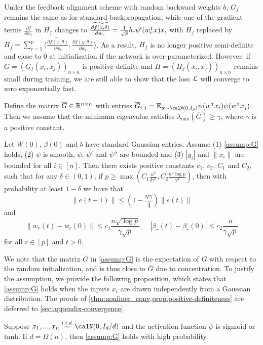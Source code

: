 Under the feedback alignment scheme with random backward weights $b$, $G_f$ remains the same as for standard backpropagation, while one of the gradient terms $\frac{\partial f}{\partial w_r}$ in $H_f$ changes to
$\widetilde{\frac{\partial f(x, \theta)}{\partial w_r}}   = \frac{1}{\sqrt{p}} b_r \psi'(w_r\transpose x)x,
$
with $H_f$ replaced by $H_f = \sum_{r=1}^p\Big\langle \widetilde{\frac{\partial f (x,\theta)}{\partial w_r}},\frac{\partial f (y,\theta)}{\partial w_r}\Big\rangle$.
As a result, $H_f$ is no longer positive semi-definite and close to $0$ at initialization if the network is over-parameterized. However, if $G = (G_f(x_i,x_j))_{n\times n}$ is positive definite and $H = (H_f(x_i,x_j))_{n\times n}$ remains small during training, we are still able to show that the loss $\mathcal{L}$ will converge to zero exponentially fast.

\begin{assumption}\label{assump:G}
Define the matrix $\overline{G} \in \mathbb{R}^{n\times n}$ with entries
$\overline{G}_{i,j} = \E_{w\sim \calN(0,I_p)}\psi(w\transpose x_i) \psi(w\transpose  x_j)$.
Then we assume that the minimum eigenvalue satisfies $\lambda_{\min}(\overline{G}) \geq \gamma$, where $\gamma$ is a positive constant.
\end{assumption}
\vskip5pt

\begin{theorem}\label{thm:nonliner_conv}
Let $W(0)$, $\beta(0)$ and $b$ have \iid standard Gaussian entries. Assume \textnormal{(1)} \cref{assump:G} holds, \textnormal{(2)} $\psi$ is smooth, $\psi$, $\psi'$ and $\psi''$ are bounded and \textnormal{(3)} $|y_i|$ and $\|x_i\|$ are bounded for all $i\in[n]$. Then there exists positive constants $c_1$, $c_2$, $C_1$ and $C_2$, such that for any $\delta\in(0,1)$, if $p \geq \max\left(C_1\frac{n^2}{\delta\gamma^2}, C_2\frac{n^4\log p}{\gamma^4}\right)$, then with probability at least $1-\delta$ we have that
\begin{equation}\label{eq:conv}
    \|e(t+1)\| \leq (1-\frac{\eta\gamma}{4})\|e(t)\|
\end{equation}
and
\begin{equation}
\label{eq:weights}
    \|w_r(t)-w_r(0)\| \leq c_1\frac{n\sqrt{\log p}}{\gamma\sqrt p}, \quad |\beta_r(t)-\beta_r(0)| \leq c_2\frac{n}{\gamma\sqrt p}
\end{equation}
for all $r\in[p]$ and $t>0$.
\end{theorem}

We note that the matrix $\overline{G}$ in \cref{assump:G} is the expectation of $G$ with respect to the random initialization, and is thus close to $\overline{G}$ due to concentration. To justify the assumption, we provide the following proposition, which states that \cref{assump:G} holds when the inputs $x_i$ are drawn independently from a Gaussian distribution. The proofs of \cref{thm:nonliner_conv,prop:positive-definiteness} are deferred to \cref{sec:appendix-convergence}.

\begin{proposition}\label{prop:positive-definiteness}
Suppose $x_1,...,x_n \overset{\iid}{\sim} \calN(0,I_d/d)$ and the activation function $\psi$ is sigmoid or tanh. If $d=\Omega(n)$, then \cref{assump:G} holds with high probability.
\end{proposition}

